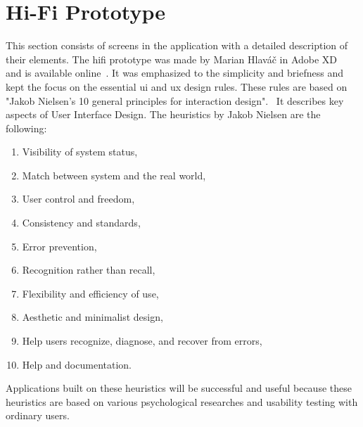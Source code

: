 \section{Hi-Fi Prototype}\label{sec:hi-fi-prototype}
This section consists of screens in the application with a detailed description of their elements.
The \acrshort{hifi} prototype was made by Marian Hlav{\' a}{\v c} in Adobe XD~\cite{adobeXD} and is available online~\cite{hifiPrototype}.
It was emphasized to the simplicity and briefness and kept the focus on the essential \acrshort{ui} and \acrshort{ux} design rules.
These rules are based on "Jakob Nielsen's 10 general principles for interaction design".~\cite{nnGroup}
It describes key aspects of User Interface Design.
The heuristics by Jakob Nielsen are the following:
\begin{enumerate}
    \item Visibility of system status,
    \item Match between system and the real world,
    \item User control and freedom,
    \item Consistency and standards,
    \item Error prevention,
    \item Recognition rather than recall,
    \item Flexibility and efficiency of use,
    \item Aesthetic and minimalist design,
    \item Help users recognize, diagnose, and recover from errors,
    \item Help and documentation.
\end{enumerate}

Applications built on these heuristics will be successful and useful because these heuristics are based on various psychological researches and usability testing with ordinary users.














